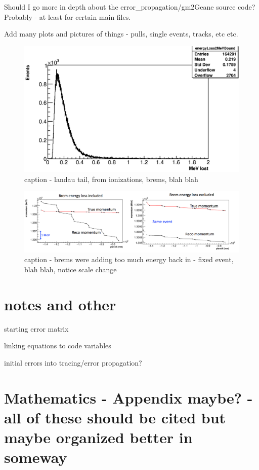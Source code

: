 \documentclass{article}
\begin{document}
Should I go more in depth about the error\_propagation/gm2Geane source code? Probably - at least for certain main files.


Add many plots and pictures of things - pulls, single events, tracks, etc etc.

\begin{figure}[h]
\caption{caption - landau tail, from ionizations, brems, blah blah}
\centering
\includegraphics[width=1.0\textwidth]{eLoss}
\end{figure}

\begin{figure}[h]
\caption{caption - brems were adding too much energy back in - fixed event, blah blah, notice scale change}
\centering
\includegraphics[width=1.0\textwidth]{bremComparison}
\end{figure}


\section{notes and other}

  starting error matrix

  linking equations to code variables

  initial errors into tracing/error propagation?


\section{Mathematics - Appendix maybe? - all of these should be cited but maybe organized better in someway}
\end{document}
